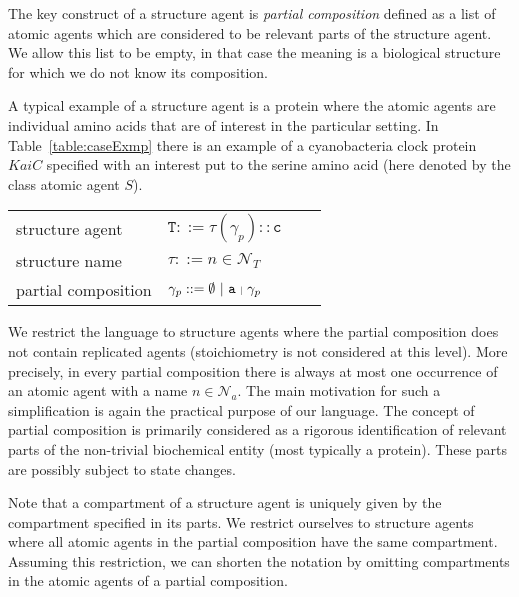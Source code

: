 \documentclass{entcs}
\renewcommand{\~}[0]{\texttildelow}
\newcommand{\pipe}{{}{\scalebox{.6}{$|$}}{}}
\newcommand{\choice}{|}
\begin{document}
The key construct of a structure agent is \emph{partial composition} defined as a list of atomic agents which are considered to be relevant parts of the structure agent. We allow this list to be empty, in that case the meaning is a biological structure for which we do not know its composition.

A typical example of a structure agent is a protein where the atomic agents are individual amino acids that are of interest in the particular setting. In Table~\ref{table:caseExmp} there is an example of a cyanobacteria clock protein $KaiC$ specified with an interest put to the serine amino acid (here denoted by the class atomic agent $S$).    

\begin{center}
{\small
\hspace*{-1cm}\begin{tabular}{ ll ll }
 structure agent & $\mathtt{T} ::= \tau(\gamma_p)::\mathtt{c}$\\
 structure name & $\tau ::= n \in \mathcal{N}_{T}$\\
 partial composition & $\gamma_p ::= \emptyset~\choice~\mathtt{a}~\pipe~\gamma_p$\\
\end{tabular}
}
\end{center}

We restrict the language to structure agents where the partial composition does not contain replicated agents (stoichiometry is not considered at this level). More precisely, in every partial composition there is always at most one occurrence of an atomic agent with a name $n\in\mathcal{N}_a$.
 The main motivation for such a simplification is again the practical purpose of our language. The concept of partial composition is primarily considered as a rigorous identification of relevant parts of the non-trivial biochemical entity (most typically a protein). These parts are possibly subject to state changes. 

Note that a compartment of a structure agent is uniquely given by the compartment specified in its parts. We restrict ourselves to structure agents where all atomic agents in the partial composition have the same compartment. Assuming this restriction, we can shorten the notation by omitting compartments in the atomic agents of a partial composition.    
\end{document}
